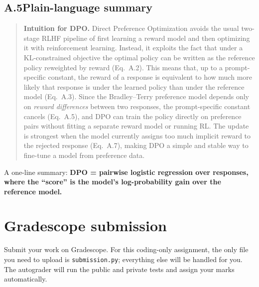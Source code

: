 \documentclass[11pt]{article}
\begin{document}
\subsection*{A.5\quad Plain-language summary}

\begin{quote}
\textbf{Intuition for DPO.}\enspace
Direct Preference Optimization avoids the usual two-stage RLHF pipeline of first learning a reward model and then optimizing it with reinforcement learning.
Instead, it exploits the fact that under a KL-constrained objective the optimal policy can be written as the reference policy reweighted by reward (Eq.~A.2).
This means that, up to a prompt-specific constant, the reward of a response is equivalent to how much more likely that response is under the learned policy than under the reference model (Eq.~A.3).
Since the Bradley--Terry preference model depends only on \emph{reward differences} between two responses, the prompt-specific constant cancels (Eq.~A.5), and DPO can train the policy directly on preference pairs without fitting a separate reward model or running RL.
The update is strongest when the model currently assigns too much implicit reward to the rejected response (Eq.~A.7), making DPO a simple and stable way to fine-tune a model from preference data.
\end{quote}

\noindent A one-line summary: \textbf{DPO = pairwise logistic regression over responses, where the ``score'' is the model's log-probability gain over the reference model.}

\section*{Gradescope submission}

Submit your work on Gradescope. For this coding-only assignment, the only file you need to upload is \texttt{submission.py}; everything else will be handled for you. The autograder will run the public and private tests and assign your marks automatically.
\end{document}
